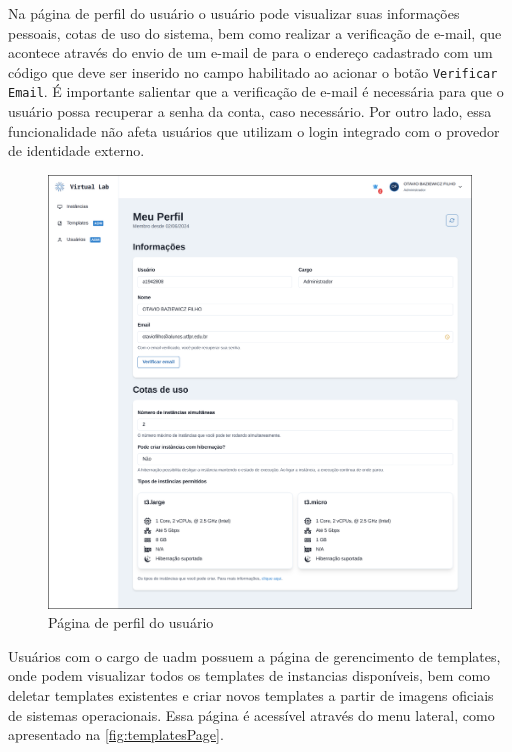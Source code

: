 Na página de perfil do usuário o usuário pode visualizar suas informações pessoais, cotas de uso do sistema, bem como realizar a verificação de e-mail, que acontece através do envio de um e-mail de para o endereço cadastrado com um código que deve ser inserido no campo habilitado ao acionar o botão \texttt{Verificar Email}. É importante salientar que a verificação de e-mail é necessária para que o usuário possa recuperar a senha da conta, caso necessário. Por outro lado, essa funcionalidade não afeta usuários que utilizam o login integrado com o provedor de identidade externo.

\begin{figure}[H]
\caption{Página de perfil do usuário}
\label{fig:userProfile}
\includegraphics[width=\textwidth]{capitulos/3-resultados/files/profile.png}
\end{figure}

Usuários com o cargo de \gls{uadm} possuem a página de gerencimento de templates, onde podem visualizar todos os templates de instancias disponíveis, bem como deletar templates existentes e criar novos templates a partir de imagens oficiais de sistemas operacionais. Essa página é acessível através do menu lateral, como apresentado na \autoref{fig:templatesPage}.

